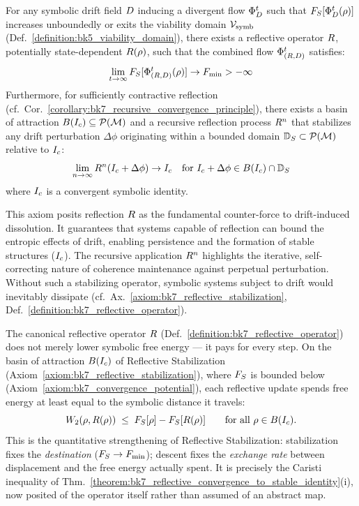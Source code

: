 \begin{axiom}
\label{axiom:bk7_reflective_stabilization}
For any symbolic drift field \(D\) inducing a divergent flow \(\Phi_{D}^t\) such that \(F_S[\Phi_{D}^t(\rho)]\) increases unboundedly or exits the viability domain \(\mathcal{V}_{\mathrm{symb}}\) (Def.~\ref{definition:bk5_viability_domain}), there exists a reflective operator \(R\), potentially state-dependent \(R(\rho)\), such that the combined flow \(\Phi_{(R,D)}^t\) satisfies:
\[
\lim_{t\to\infty} F_S[\Phi_{(R,D)}^t(\rho)] \to F_{\min} > -\infty
\]
Furthermore, for sufficiently contractive reflection (cf.~Cor.~\ref{corollary:bk7_recursive_convergence_principle}), there exists a basin of attraction \(B(I_c) \subseteq \mathcal{P}(\mathcal{M})\) and a recursive reflection process \(R^n\) that stabilizes any drift perturbation \(\Delta \phi\) originating within a bounded domain \(\mathbb{D}_S \subset \mathcal{P}(\mathcal{M})\) relative to \(I_c\):
\[
\lim_{n\to\infty} R^n(I_c + \Delta \phi) \to I_c \quad \text{for } I_c + \Delta \phi \in B(I_c) \cap \mathbb{D}_S
\]
where \(I_c\) is a convergent symbolic identity.
\end{axiom}
\begin{remark}
\label{remark:bk7_unnamed_remark_02}
This axiom posits reflection \(R\) as the fundamental counter-force to drift-induced dissolution. It guarantees that systems capable of reflection can bound the entropic effects of drift, enabling persistence and the formation of stable structures (\(I_c\)). The recursive application \(R^n\) highlights the iterative, self-correcting nature of coherence maintenance against perpetual perturbation. Without such a stabilizing operator, symbolic systems subject to drift would inevitably dissipate (cf.~Ax.~\ref{axiom:bk7_reflective_stabilization}, Def.~\ref{definition:bk7_reflective_operator}).
\end{remark}
\begin{axiom}
\label{axiom:bk7_caristi_descent_for_reflection}
The canonical reflective operator \(R\) (Def.~\ref{definition:bk7_reflective_operator}) does not merely lower symbolic free energy --- it pays for every step. On the basin of attraction \(B(I_c)\) of Reflective Stabilization (Axiom~\ref{axiom:bk7_reflective_stabilization}), where \(F_S\) is bounded below (Axiom~\ref{axiom:bk7_convergence_potential}), each reflective update spends free energy at least equal to the symbolic distance it travels:
\[
W_2(\rho, R(\rho)) \;\le\; F_S[\rho] - F_S[R(\rho)]
\qquad \text{for all } \rho \in B(I_c).
\]
This is the quantitative strengthening of Reflective Stabilization: stabilization fixes the \emph{destination} (\(F_S \to F_{\min}\)); descent fixes the \emph{exchange rate} between displacement and the free energy actually spent. It is precisely the Caristi inequality of Thm.~\ref{theorem:bk7_reflective_convergence_to_stable_identity}(i), now posited of the operator itself rather than assumed of an abstract map.
\end{axiom}
